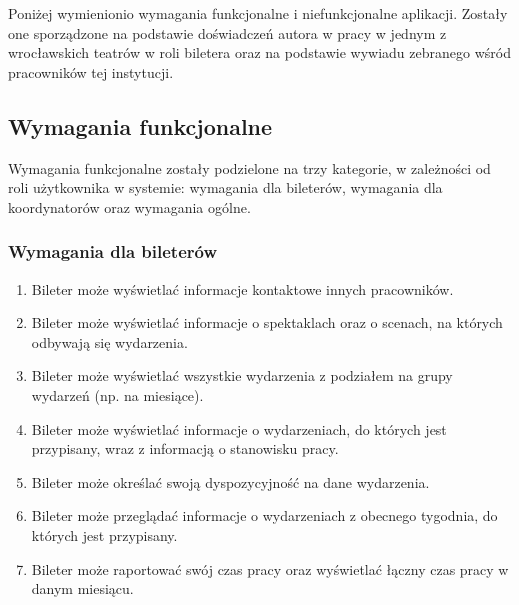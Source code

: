 \documentclass[shortabstract]{iithesis}
\begin{document}
Poniżej wymienionio wymagania funkcjonalne i niefunkcjonalne aplikacji. Zostały one sporządzone na podstawie doświadczeń autora w pracy w jednym z wrocławskich teatrów w roli biletera oraz na podstawie wywiadu zebranego wśród pracowników tej instytucji.

\subsection{Wymagania funkcjonalne}

Wymagania funkcjonalne zostały podzielone na trzy kategorie, w zależności od roli użytkownika w systemie: wymagania dla bileterów, wymagania dla koordynatorów oraz wymagania ogólne.


\newpage
\subsubsection*{Wymagania dla bileterów}
\begin{enumerate}
  \item Bileter może wyświetlać informacje kontaktowe innych pracowników.
  \item Bileter może wyświetlać informacje o spektaklach oraz o scenach, na których odbywają się wydarzenia.
  \item Bileter może wyświetlać wszystkie wydarzenia z podziałem na grupy wydarzeń (np. na miesiące).
  \item Bileter może wyświetlać informacje o wydarzeniach, do których jest przypisany, wraz z informacją o stanowisku pracy.
  \item Bileter może określać swoją dyspozycyjność na dane wydarzenia.
  \item Bileter może przeglądać informacje o wydarzeniach z obecnego tygodnia, do których jest przypisany.
  \item Bileter może raportować swój czas pracy oraz wyświetlać łączny czas pracy w danym miesiącu.
\end{enumerate}
\end{document}
